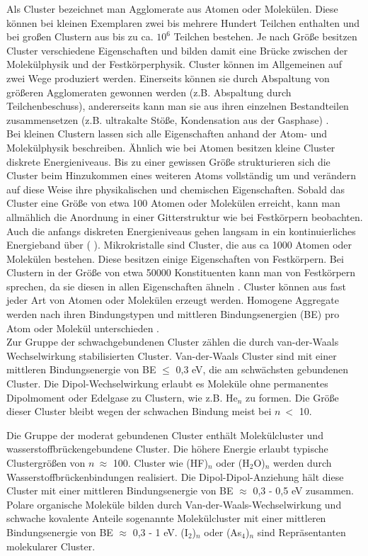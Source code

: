Als Cluster bezeichnet man Agglomerate aus Atomen oder Molekülen. Diese können bei kleinen Exemplaren zwei bis mehrere Hundert Teilchen enthalten und bei großen Clustern aus bis zu ca. $\mathrm{10^6}$ Teilchen bestehen. Je nach Größe besitzen Cluster verschiedene Eigenschaften und bilden damit eine Brücke zwischen der Molekülphysik und der Festkörperphysik. Cluster können im Allgemeinen auf zwei Wege produziert werden. Einerseits können sie durch Abspaltung von größeren Agglomeraten gewonnen werden (z.B. Abspaltung durch Teilchenbeschuss), andererseits kann man sie aus ihren einzelnen Bestandteilen zusammensetzen (z.B. ultrakalte Stöße, Kondensation aus der Gasphase) \cite{barth2007}. \\
Bei kleinen Clustern lassen sich alle Eigenschaften anhand der Atom- und Molekülphysik beschreiben. Ähnlich wie bei Atomen besitzen kleine Cluster diskrete Energieniveaus.
Bis zu einer gewissen Größe strukturieren sich die Cluster beim Hinzukommen eines weiteren Atoms vollständig um und verändern auf diese Weise ihre physikalischen und chemischen Eigenschaften. Sobald das Cluster eine Größe von etwa 100 Atomen oder Molekülen erreicht, kann man allmählich die Anordnung in einer Gitterstruktur wie bei Festkörpern beobachten. Auch die anfangs diskreten Energieniveaus gehen langsam in ein kontinuierliches Energieband über (\cite{benedek1988} \cite{General08}).
 Mikrokristalle sind Cluster, die aus ca 1000 Atomen oder Molekülen bestehen. Diese besitzen einige Eigenschaften von Festkörpern. Bei Clustern in der Größe von etwa 50000 Konstituenten kann man von Festkörpern sprechen, da sie diesen in allen Eigenschaften ähneln \cite{General08}. Cluster können aus fast jeder Art von Atomen oder Molekülen erzeugt werden. Homogene Aggregate werden nach ihren Bindungstypen und mittleren Bindungsenergien (BE) pro Atom oder Molekül unterschieden \cite{jortner1984cluster}. \\
 Zur Gruppe der schwachgebundenen Cluster zählen die durch van-der-Waals Wechselwirkung stabilisierten Cluster. Van-der-Waals Cluster sind mit einer mittleren Bindungsenergie von BE $\leq$ 0,3 eV, die am schwächsten gebundenen Cluster. Die Dipol-Wechselwirkung erlaubt es Moleküle ohne permanentes Dipolmoment oder Edelgase zu Clustern, wie z.B. $\mathrm{He}_n$ zu formen. Die Größe dieser Cluster bleibt wegen der schwachen Bindung meist bei $n \ <$ 10. \cite{jortner1984cluster}
 
 Die Gruppe der moderat gebundenen Cluster enthält Molekülcluster und wasserstoffbrückengebundene Cluster. Die höhere Energie erlaubt typische Clustergrößen von $n \ \approx$ 100.
 Cluster wie (HF)$_n$ oder (H$_2$O)$_n$ werden durch Wasserstoffbrückenbindungen realisiert. Die Dipol-Dipol-Anziehung hält diese Cluster mit einer mittleren Bindungsenergie von BE $\approx$ 0,3 - 0,5 eV zusammen. \cite{jortner1984cluster}
 Polare organische Moleküle bilden durch Van-der-Waals-Wechselwirkung und schwache kovalente Anteile sogenannte Molekülcluster mit einer mittleren Bindungsenergie von BE $\approx$ 0,3 - 1 eV. (I$_2$)$_n$ oder (As$_4$)$_n$ sind Repräsentanten molekularer Cluster. \cite{jortner1984cluster}
 
